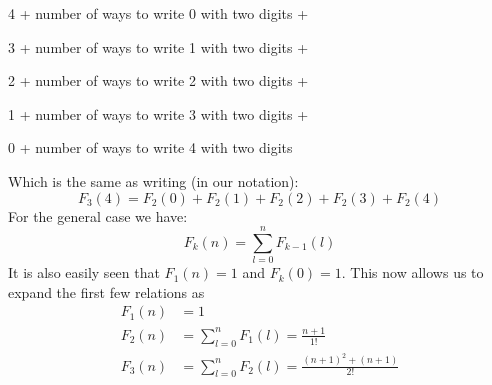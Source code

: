 \documentclass[a4paper]{article}
\begin{document}
\begin{enumerate}[label=(\alph*)]
\begin{enumerate}[label=(\roman*)]
{4 + {number of ways to write 0 with two digits}} +\par

{3 + {number of ways to write 1 with two digits}} +\par

{2 + {number of ways to write 2 with two digits}} +\par

{1 + {number of ways to write 3 with two digits}} +\par

{0 + {number of ways to write 4 with two digits}}\par
Which is the same as writing (in our notation):
\[F_3(4)=F_2(0)+F_2(1)+F_2(2)+F_2(3)+F_2(4)\]
For the general case we have: 
\[F_k(n) = \sum_{l = 0}^{n}F_{k-1}(l)  \]
It is also easily seen that $F_1(n) = 1$ and $F_k(0) = 1$. This now allows us to expand the first few relations as
\begin{align*} 
	F_1(n) &=  1 \\ 
	F_2(n) &=  \sum_{l = 0}^{n}F_1(l) = \frac{n + 1}{1!} \\ 
	F_3(n) &=  \sum_{l = 0}^{n}F_2(l) = \frac{{(n + 1)}^2 + (n + 1)}{2!}  
	\end{align*}
		\end{enumerate}
\end{enumerate}
\end{document}
